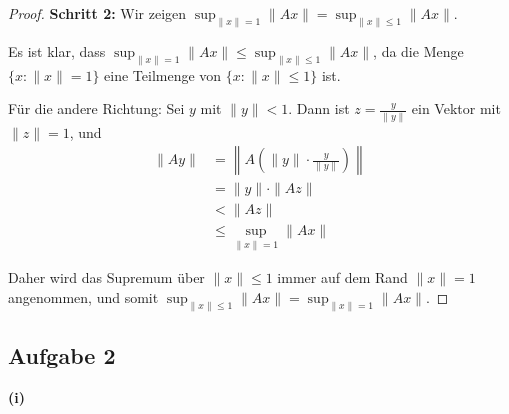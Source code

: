 \documentclass{article}
\begin{document}
\begin{proof}
    \textbf{Schritt 2:} Wir zeigen $\sup_{\|x\|=1} \|Ax\| = \sup_{\|x\|\leq1} \|Ax\|$.
    
    Es ist klar, dass $\sup_{\|x\|=1} \|Ax\| \leq \sup_{\|x\|\leq1} \|Ax\|$, da die Menge $\{x : \|x\|=1\}$ eine Teilmenge von $\{x : \|x\|\leq1\}$ ist.
    
    Für die andere Richtung: Sei $y$ mit $\|y\| < 1$. Dann ist $z = \frac{y}{\|y\|}$ ein Vektor mit $\|z\|=1$, und 
    \begin{align*}
    \|Ay\| &= \left\|A\left(\|y\| \cdot \frac{y}{\|y\|}\right)\right\| \\
    &= \|y\| \cdot \|Az\| \\
    &< \|Az\| \\
    &\leq \sup_{\|x\|=1} \|Ax\|
    \end{align*}
    
    Daher wird das Supremum über $\|x\|\leq1$ immer auf dem Rand $\|x\|=1$ angenommen, und somit $\sup_{\|x\|\leq1} \|Ax\| = \sup_{\|x\|=1} \|Ax\|$.
\end{proof}

\clearpage

\subsection*{Aufgabe 2}

\textbf{(i)}
\end{document}
